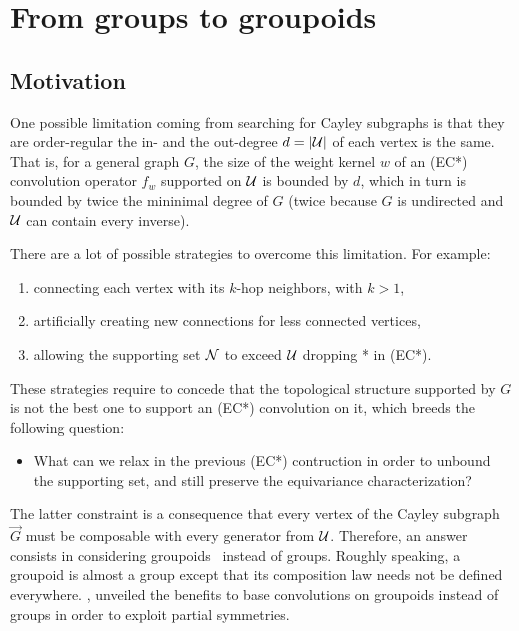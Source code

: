 \section{From groups to groupoids}


\subsection{Motivation}

One possible limitation coming from searching for Cayley subgraphs is that they are order-regular \ie the in- and the out-degree $d = |\mathcal{U}|$ of each vertex is the same. That is, for a general graph $G$, the size of the weight kernel $w$ of an (EC*) convolution operator $f_w$ supported on $\mathcal{U}$ is bounded by $d$, which in turn is bounded by twice the mininimal degree of $G$ (twice because $G$ is undirected and $\mathcal{U}$ can contain every inverse).

There are a lot of possible strategies to overcome this limitation. For example:
\begin{enumerate}
  \item connecting each vertex with its $k$-hop neighbors, with $k > 1$,
  \item artificially creating new connections for less connected vertices,
  \item allowing the supporting set $\mathcal{N}$ to exceed $\mathcal{U}$ \ie dropping * in (EC*).
\end{enumerate}

These strategies require to concede that the topological structure supported by $G$ is not the best one to support an (EC*) convolution on it, which breeds the following question:
\begin{itemize}
  \item What can we relax in the previous (EC*) contruction in order to unbound the supporting set, and still preserve the equivariance characterization?
\end{itemize}

The latter constraint is a consequence that every vertex of the Cayley subgraph $\vec{G}$ must be composable with every generator from $\mathcal{U}$. Therefore, an answer consists in considering groupoids~\citep{brandt1927verallgemeinerung} instead of groups. Roughly speaking, a groupoid is almost a group except that its composition law needs not be defined everywhere. \cite{weinstein1996groupoids}, unveiled the benefits to base convolutions on groupoids instead of groups in order to exploit partial symmetries.


